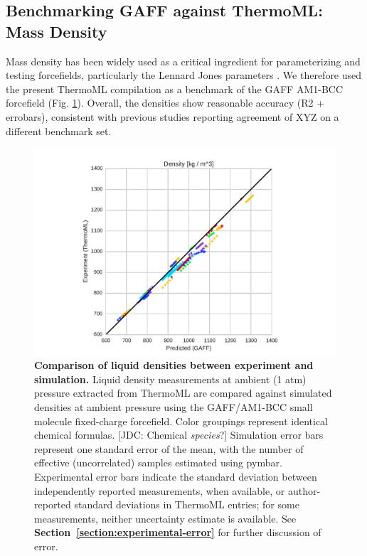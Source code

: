 \documentclass[aps,pre,twocolumn,nofootinbib,superscriptaddress,linenumbers]{revtex4-1}
\begin{document}

\subsection{Benchmarking GAFF against ThermoML: Mass Density}

Mass density has been widely used as a critical ingredient for parameterizing and testing forcefields, particularly the Lennard Jones parameters \cite{jorgensen1983comparison, jorgensen1984optimized}.  
We therefore used the present ThermoML compilation as a benchmark of the GAFF AM1-BCC forcefield (Fig. \ref{figure:Density}).  
Overall, the densities show reasonable accuracy (R2 + errobars), consistent with previous studies \cite{caleman2011force} reporting agreement of XYZ on a different benchmark set.  


\begin{figure}
\includegraphics[width=\columnwidth]{./figures/densities_thermoml.pdf}
\caption{{\bf Comparison of liquid densities between experiment and simulation.}
Liquid density measurements at ambient (1 atm) pressure extracted from ThermoML are compared against simulated densities at ambient pressure using the GAFF/AM1-BCC small molecule fixed-charge forcefield.
Color groupings represent identical chemical formulas.  
{\color{red}[JDC: Chemical \emph{species}?]}
Simulation error bars represent one standard error of the mean, with the number of effective (uncorrelated) samples estimated using pymbar.  
Experimental error bars indicate the standard deviation between independently reported measurements, when available, or author-reported standard deviations in ThermoML entries; for some measurements, neither uncertainty estimate is available.  
See {\bf Section~\ref{section:experimental-error}} for further discussion of error.
}
\label{figure:Density}
\end{figure}
\end{document}
